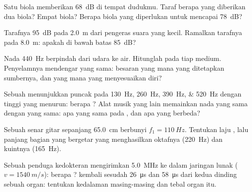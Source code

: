 \begin{exercise}[$\star\star$]\label{exo:g12:sound-acoustics:7}
Satu biola memberikan \qty{68}{dB} di tempat dudukmu. Taraf berapa yang
diberikan dua biola? Empat biola? Berapa biola yang diperlukan untuk
mencapai \qty{78}{dB}?
\end{exercise}

\begin{exercise}[$\star\star$]\label{exo:g12:sound-acoustics:8}
Tarafnya \qty{95}{dB} pada \qty{2.0}{m} dari pengeras suara yang kecil.
Ramalkan tarafnya pada \qty{8.0}{m}: apakah di bawah batas \qty{85}{dB}?
\end{exercise}

\begin{exercise}[$\star\star$]\label{exo:g12:sound-acoustics:9}
Nada \qty{440}{Hz} berpindah dari udara ke air. Hitunglah  pada tiap medium. Penyelamnya mendengar  yang
sama: besaran yang mana yang ditetapkan sumbernya, dan yang mana yang
menyesuaikan diri?
\end{exercise}

\begin{exercise}[$\star\star$]\label{exo:g12:sound-acoustics:10}
Sebuah  menunjukkan puncak pada \qtylist{130;260;390;520}{Hz}
dengan tinggi yang menurun: berapa ? Alat musik yang lain
memainkan nada yang sama dengan  yang sama: apa yang sama
pada , dan apa yang berbeda?
\end{exercise}

\begin{exercise}[$\star\star$]\label{exo:g12:sound-acoustics:11}
Sebuah senar gitar sepanjang \qty{65.0}{cm} berbunyi
$f_1 = \qty{110}{Hz}$. Tentukan laju , lalu panjang bagian
yang bergetar yang menghasilkan oktafnya (\qty{220}{Hz}) dan
kuintnya (\qty{165}{Hz}).
\end{exercise}

\begin{exercise}[$\star\star\star$]\label{exo:g12:sound-acoustics:12}
Sebuah penduga kedokteran mengirimkan  \qty{5.0}{MHz} ke dalam
jaringan lunak ($v = \qty{1540}{m/s}$): berapa ?
 kembali sesudah \qty{26}{\micro s} dan \qty{58}{\micro s} dari
kedua dinding sebuah organ: tentukan kedalaman masing-masing dan tebal
organ itu.
\end{exercise}

